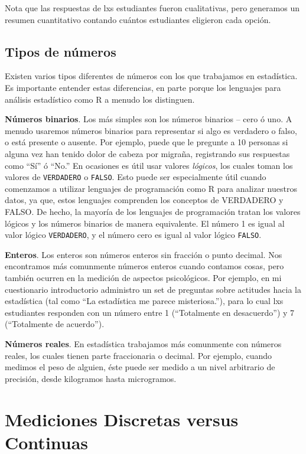 \documentclass[
  12pt,
]{book}
\begin{document}
Nota que las respuestas de lxs estudiantes fueron cualitativas, pero generamos un resumen cuantitativo contando cuántos estudiantes eligieron cada opción.

\hypertarget{tipos-de-nuxfameros}{%
\subsection{Tipos de números}\label{tipos-de-nuxfameros}}

Existen varios tipos diferentes de números con los que trabajamos en estadística. Es importante entender estas diferencias, en parte porque los lenguajes para análisis estadístico como R a menudo los distinguen.

\textbf{Números binarios}. Los más simples son los números binarios -- cero ó uno. A menudo usaremos números binarios para representar si algo es verdadero o falso, o está presente o ausente. Por ejemplo, puede que le pregunte a 10 personas si alguna vez han tenido dolor de cabeza por migraña, registrando sus respuestas como ``Sí'' ó ``No.'' En ocasiones es útil usar valores \emph{lógicos}, los cuales toman los valores de \texttt{VERDADERO} o \texttt{FALSO}. Esto puede ser especialmente útil cuando comenzamos a utilizar lenguajes de programación como R para analizar nuestros datos, ya que, estos lenguajes comprenden los conceptos de VERDADERO y FALSO. De hecho, la mayoría de los lenguajes de programación tratan los valores lógicos y los números binarios de manera equivalente. El número 1 es igual al valor lógico \texttt{VERDADERO}, y el número cero es igual al valor lógico \texttt{FALSO}.

\textbf{Enteros}. Los enteros son números enteros sin fracción o punto decimal. Nos encontramos más comunmente números enteros cuando contamos cosas, pero también ocurren en la medición de aspectos psicológicos. Por ejemplo, en mi cuestionario introductorio administro un set de preguntas sobre actitudes hacia la estadística (tal como ``La estadística me parece misteriosa.''), para lo cual lxs estudiantes responden con un número entre 1 (``Totalmente en desacuerdo'') y 7 (``Totalmente de acuerdo'').

\textbf{Números reales}. En estadística trabajamos más comunmente con números reales, los cuales tienen parte fraccionaria o decimal. Por ejemplo, cuando medimos el peso de alguien, éste puede ser medido a un nivel arbitrario de precisión, desde kilogramos hasta microgramos.

\hypertarget{mediciones-discretas-versus-continuas}{%
\section{Mediciones Discretas versus Continuas}\label{mediciones-discretas-versus-continuas}}
\end{document}
